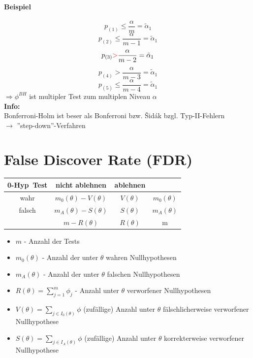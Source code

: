 \documentclass[10pt]{report}
\theoremstyle{definition}
\begin{document}
\paragraph{Beispiel}
\[ p_{(1)} \leq \frac{\alpha}{m} = \tilde{\alpha}_1 \]
\[ p_{(2)} \leq \frac{\alpha}{m-1} = \tilde{\alpha}_1 \]
\[ p_{(3)} \textcolor{red}{>} \frac{\alpha}{m-2} = \tilde{\alpha}_1 \]
\[ p_{(4)} > \frac{\alpha}{m-3} = \tilde{\alpha}_1 \]
\[ p_{(5)} \leq \frac{\alpha}{m-4} = \tilde{\alpha}_1 \]
$\Rightarrow \phi^{BH}$ ist multipler Test zum multiplen Niveau $\alpha$  \\
\textbf{Info:} \\
Bonferroni-Holm ist beser als Bonferroni bzw. \v Sid\'ak bzgl. Typ-II-Fehlern\\
$\rightarrow$ ''step-down''-Verfahren

\section{False Discover Rate (FDR) }
\begin{tabular}{c|c|c|c}
0-Hyp\ Test & nicht ablehnen & ablehnen & \\ \hline
wahr & \cellcolor{yellow!25} $m_0 (\theta) - V(\theta)$ & \cellcolor{yellow!25}$V(\theta)$ & \cellcolor{yellow!25}$m_0(\theta)$\\ \hline
falsch &\cellcolor{yellow!25}$m_A (\theta) - S(\theta)$  &\cellcolor{yellow!25} $S(\theta)$ &\cellcolor{yellow!25} $m_A(\theta)$\\ \hline
& \cellcolor{red!25}$m-R(\theta)$ & \cellcolor{red!25}$R(\theta)$ & m\\
\end{tabular}

\begin{itemize}
 \item $m$ - Anzahl der Tests \\
 \item $m_0 (\theta)$ - Anzahl der unter $\theta$ wahren Nullhypothesen \\
 \item $m_A (\theta)$ - Anzahl der unter $\theta$ falschen Nullhypothesen \\
 \item $R(\theta) = \sum\limits_{j=1}^m \phi_j$ - Anzahl unter $\theta$ verworfener Nullhypothesen
 \item $V(\theta) = \sum\limits_{j \in I_0(\theta)} \phi $ (zufällige) Anzahl unter $\theta$ fälschlicherweise verworfener Nullhypothese 
 \item $S(\theta) = \sum\limits_{j \in I_A(\theta)} \phi $ (zufällige) Anzahl unter $\theta$ korrekterweise verworfener Nullhypothese 
\end{itemize}
\end{document}
